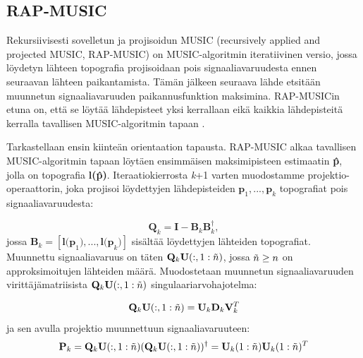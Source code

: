 \subsection{RAP-MUSIC}
Rekursiivisesti sovelletun ja projisoidun MUSIC (recursively applied and projected MUSIC, RAP-MUSIC) \citep{Mosher1999SourceMUSIC} on MUSIC-algoritmin iteratiivinen versio, jossa löydetyn lähteen topografia projisoidaan pois signaaliavaruudesta ennen seuraavan lähteen paikantamista. Tämän jälkeen seuraava lähde etsitään muunnetun signaaliavaruuden paikannusfunktion maksimina. RAP-MUSICin etuna on, että se löytää lähdepisteet yksi kerrallaan eikä kaikkia lähdepisteitä kerralla tavallisen MUSIC-algoritmin tapaan \citep{Makela2018TruncatedLocalization}.


Tarkastellaan ensin kiinteän orientaation tapausta. RAP-MUSIC alkaa tavallisen MUSIC-algoritmin tapaan löytäen ensimmäisen maksimipisteen estimaatin \textbf{\^p}, jolla on topografia \textbf{l(\^p)}. Iteraatiokierrosta \textit{k}+1 varten muodostamme projektio-operaattorin, joka projisoi löydettyjen lähdepisteiden $\mathbf{p}_1,...,\mathbf{p}_{k}$ topografiat pois signaaliavaruudesta:

\begin{equation}
    \mathbf{Q}_k = \mathbf{I}-\mathbf{B}_k\mathbf{B}_k^\dagger,
\end{equation}
jossa $\mathbf{B}_k = [\mathbf{l(p}_1),...,\mathbf{l(p}_{k})]$ sisältää löydettyjen lähteiden topografiat. Muunnettu signaaliavaruus on täten $\mathbf{Q}_k\mathbf{U}(:,1:\Tilde{n})$, jossa $\Tilde{n} \geq n$ on approksimoitujen lähteiden määrä. Muodostetaan muunnetun signaaliavaruuden virittäjämatriisista $\mathbf{Q}_k\mathbf{U}(:,1:\Tilde{n})$ singulaariarvohajotelma:

\begin{equation}
    \mathbf{Q}_k\mathbf{U}(:,1:\Tilde{n}) = \mathbf{U}_k\mathbf{D}_k\mathbf{V}_k^T
    \label{eq:rap}
\end{equation}
ja sen avulla projektio muunnettuun signaaliavaruuteen:
\begin{equation}
    \mathbf{P}_k = \mathbf{Q}_k\mathbf{U}(:,1:\Tilde{n})(\mathbf{Q}_k\mathbf{U}(:,1:\Tilde{n}))^{\dagger} = \mathbf{U}_k(1:\Tilde{n})\mathbf{U}_k(1:\Tilde{n})^T
\end{equation}

